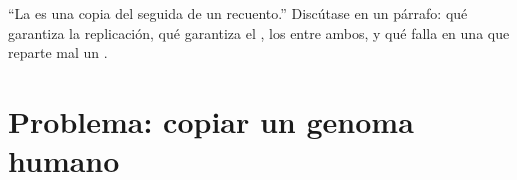 \begin{exercise}[$\star\star\star$]\label{exo:b1:replication-mitosis:12}
``La  es una copia del  seguida de un recuento.'' Discútase en
un párrafo: qué garantiza la replicación, qué garantiza el , los  entre ambos, y qué falla en una  que reparte mal un
.
\end{exercise}

\section{Problema: copiar un genoma humano}

